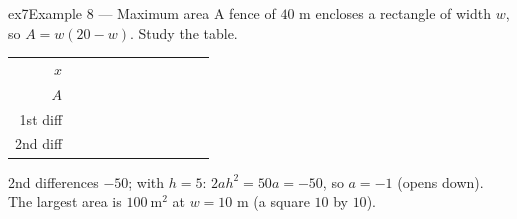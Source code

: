 \documentclass[11pt]{article}
\begin{document}
\begin{example}{ex7}{Example 8 --- Maximum area}
A fence of $40$ m encloses a rectangle of width $w$, so $A=w(20-w)$. Study the table.
\begin{center}\renewcommand{\arraystretch}{1.15}\setlength{\tabcolsep}{2pt}\begin{tabular}{r|>{\centering\arraybackslash}p{0.62cm}>{\centering\arraybackslash}p{0.62cm}>{\centering\arraybackslash}p{0.62cm}>{\centering\arraybackslash}p{0.62cm}>{\centering\arraybackslash}p{0.62cm}>{\centering\arraybackslash}p{0.62cm}>{\centering\arraybackslash}p{0.62cm}>{\centering\arraybackslash}p{0.62cm}>{\centering\arraybackslash}p{0.62cm}>{\centering\arraybackslash}p{0.62cm}}
$x$ & \multicolumn{2}{c}{\colorbox{iagreen}{\makebox[1.12cm]{\strut \color{white}\bfseries $0$}}} & \multicolumn{2}{c}{\colorbox{iagreen}{\makebox[1.12cm]{\strut \color{white}\bfseries $5$}}} & \multicolumn{2}{c}{\colorbox{iagreen}{\makebox[1.12cm]{\strut \color{white}\bfseries $10$}}} & \multicolumn{2}{c}{\colorbox{iagreen}{\makebox[1.12cm]{\strut \color{white}\bfseries $15$}}} & \multicolumn{2}{c}{\colorbox{iagreen}{\makebox[1.12cm]{\strut \color{white}\bfseries $20$}}} \\[2pt]
$A$ & \multicolumn{2}{c}{\colorbox{keybg}{\makebox[1.12cm]{\strut $0$}}} & \multicolumn{2}{c}{\colorbox{keybg}{\makebox[1.12cm]{\strut $75$}}} & \multicolumn{2}{c}{\colorbox{keybg}{\makebox[1.12cm]{\strut $100$}}} & \multicolumn{2}{c}{\colorbox{keybg}{\makebox[1.12cm]{\strut $75$}}} & \multicolumn{2}{c}{\colorbox{keybg}{\makebox[1.12cm]{\strut $0$}}} \\[2pt]
\textcolor{exblue}{\scriptsize 1st diff} & & \multicolumn{2}{c}{\colorbox{exbg}{\makebox[1.12cm]{\strut \textcolor{exblue}{$+75$}}}} & \multicolumn{2}{c}{\colorbox{exbg}{\makebox[1.12cm]{\strut \textcolor{exblue}{$+25$}}}} & \multicolumn{2}{c}{\colorbox{exbg}{\makebox[1.12cm]{\strut \textcolor{exblue}{$-25$}}}} & \multicolumn{2}{c}{\colorbox{exbg}{\makebox[1.12cm]{\strut \textcolor{exblue}{$-75$}}}} & \\[2pt]
\textcolor{qorange}{\scriptsize 2nd diff} & & & \multicolumn{2}{c}{\colorbox{qbg}{\makebox[1.12cm]{\strut \textcolor{qorange!70!black}{$-50$}}}} & \multicolumn{2}{c}{\colorbox{qbg}{\makebox[1.12cm]{\strut \textcolor{qorange!70!black}{$-50$}}}} & \multicolumn{2}{c}{\colorbox{qbg}{\makebox[1.12cm]{\strut \textcolor{qorange!70!black}{$-50$}}}} & & \\
\end{tabular}\end{center}
\soln 2nd differences $-50$; with $h=5$: $2ah^2=50a=-50$, so $a=-1$ (opens down). The largest area is $100\ \text{m}^2$ at $w=10$ m (a square $10$ by $10$).

\end{example}
\end{document}
